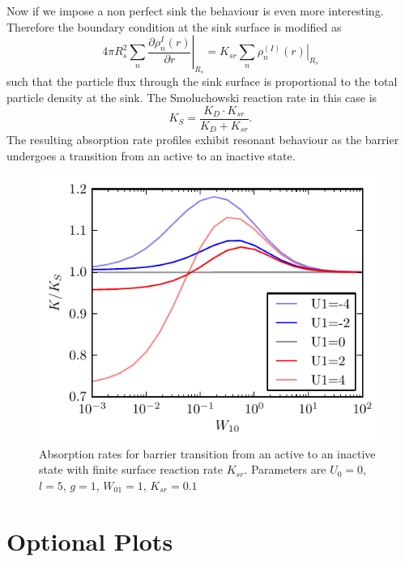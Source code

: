 \documentclass[twocolumn,superscriptaddress]{revtex4}
\begin{document}
Now if we impose a non perfect sink the behaviour is even more interesting. Therefore the boundary condition at the sink surface is modified as
\begin{equation}
    4 \pi R_s^2 \sum_n \left. \frac{\partial \rho_n^{I}(r)}{\partial r} \right|_{R_s} = K_{sr} \sum_n \left. \rho_n^{(I)}(r) \right|_{R_s}
    \label{nonideal_sink_bc}
\end{equation}
such that the particle flux through the sink surface is proportional to the total particle density at the sink. The Smoluchowski reaction rate in this case is 
\begin{equation}
    K_S = \frac{K_D \cdot K_{sr}}{K_D + K_{sr}}.
    \label{KS_nonideal}
\end{equation}
The resulting absorption rate profiles exhibit resonant behaviour as the barrier undergoes a transition from an active to an inactive state. 
\begin{figure}[H]
    \includegraphics[width= 0.5 \textwidth]{plots/non_perfect_sink_transition.pdf}
    \caption{Absorption rates for barrier transition from an active to an inactive state with finite surface reaction rate $K_{sr}$. Parameters are $U_0 = 0$, $l=5$, $g=1$, $W_{01}=1$, $K_{sr}=0.1$}
\end{figure}
\section{Optional Plots}
\end{document}
